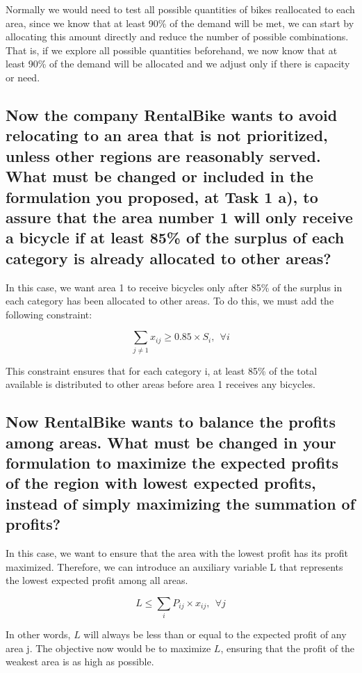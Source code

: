 \documentclass{article}
\begin{document}
	Normally we would need to test all possible quantities of bikes reallocated to each area, since we know that at least 90\% of the demand will be met, we can start by allocating this amount directly and reduce the number of possible combinations. That is, if we explore all possible quantities beforehand, we now know that at least 90\% of the demand will be allocated and we adjust only if there is capacity or need.
	
	\subsection{Now the company RentalBike wants to avoid relocating to an area that is not prioritized, unless other regions are reasonably served. What must be changed or included in the formulation you proposed, at Task 1 a), to assure that the area number 1 will only receive a bicycle if at least 85\% of the surplus of each category is already allocated to other areas?}
	
	In this case, we want area 1 to receive bicycles only after 85\% of the surplus in each category has been allocated to other areas. To do this, we must add the following constraint:
	
	\begin{equation}
		\sum_{j \neq 1}x_{ij} \geq 0.85 \times S_{i}, \ \  \forall i
	\end{equation}
	
	This constraint ensures that for each category i, at least 85\% of the total available is distributed to other areas before area 1 receives any bicycles.
	
	\subsection{Now RentalBike wants to balance the profits among areas. What must be changed in your formulation to maximize the expected profits of the region with lowest expected profits, instead of simply maximizing the summation of profits?}
	
	In this case, we want to ensure that the area with the lowest profit has its profit maximized. Therefore, we can introduce an auxiliary variable L that represents the lowest expected profit among all areas.
	
	\begin{equation}
		L \leq \sum_{i}P_{ij} \times x_{ij}, \ \  \forall j
	\end{equation}
	
	In other words, $L$ will always be less than or equal to the expected profit of any area j. The objective now would be to maximize $L$, ensuring that the profit of the weakest area is as high as possible.
	
\end{document}
